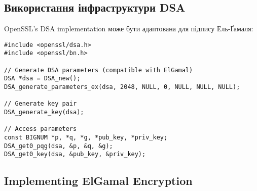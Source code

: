 \subsection{Використання інфраструктури DSA}

OpenSSL's DSA implementation може бути адаптована для підпису Ель-Ґамаля:

\begin{verbatim}
#include <openssl/dsa.h>
#include <openssl/bn.h>

// Generate DSA parameters (compatible with ElGamal)
DSA *dsa = DSA_new();
DSA_generate_parameters_ex(dsa, 2048, NULL, 0, NULL, NULL, NULL);

// Generate key pair
DSA_generate_key(dsa);

// Access parameters
const BIGNUM *p, *q, *g, *pub_key, *priv_key;
DSA_get0_pqg(dsa, &p, &q, &g);
DSA_get0_key(dsa, &pub_key, &priv_key);
\end{verbatim}

\subsection{Implementing ElGamal Encryption}

